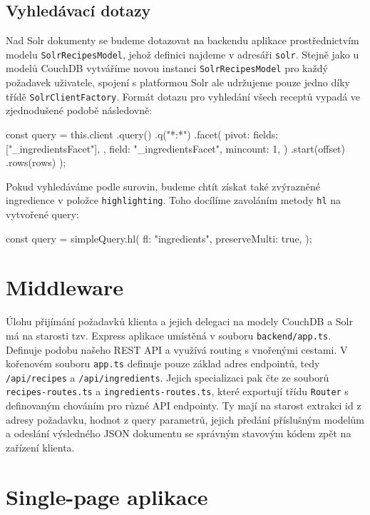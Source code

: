 \subsection{Vyhledávací dotazy}

Nad Solr dokumenty se budeme dotazovat na backendu aplikace prostřednictvím modelu \texttt{SolrRecipesModel}, jehož definici najdeme v adresáři \texttt{solr}. Stejně jako u modelů CouchDB vytváříme novou instanci \texttt{SolrRecipesModel} pro každý požadavek uživatele, spojení s platformou Solr ale udržujeme pouze jedno díky třídě \texttt{SolrClientFactory}. Formát dotazu pro vyhledání všech receptů vypadá ve zjednodušené podobě následovně:
\begingroup
\samepage
\begin{code}
const query = this.client
  .query()
  .q("*:*")
  .facet({
    pivot: {
      fields: ["_ingredientsFacet"],
    },
    field: "_ingredientsFacet",
    mincount: 1,
  })
  .start(offset)
  .rows(rows)
);
\end{code}
\endgroup

Pokud vyhledáváme podle surovin, budeme chtít získat také zvýrazněné ingredience v položce \texttt{highlighting}. Toho docílíme zavoláním metody \texttt{hl} na vytvořené query:
\begingroup
\samepage
\begin{code}
const query = simpleQuery.hl({
  fl: "ingredients",
  preserveMulti: true,
});
\end{code}
\endgroup

\section{Middleware}

Úlohu přijímání požadavků klienta a jejich delegaci na modely CouchDB a Solr má na starosti tzv. Express aplikace umístěná v souboru \texttt{backend/app.ts}. Definuje podobu našeho REST API a využívá routing s vnořenými cestami. V kořenovém souboru \texttt{app.ts} definuje pouze základ adres endpointů, tedy \texttt{/api/recipes} a \texttt{/api/ingredients}. Jejich specializaci pak čte ze souborů \texttt{recipes-routes.ts} a \texttt{ingredients-routes.ts}, které exportují třídu \texttt{Router} s definovaným chováním pro různé API endpointy. Ty mají na starost extrakci id z adresy požadavku, hodnot z query parametrů, jejich předání příslušným modelům a odeslání výsledného JSON dokumentu se správným stavovým kódem zpět na zařízení klienta.

\section{Single-page aplikace}

